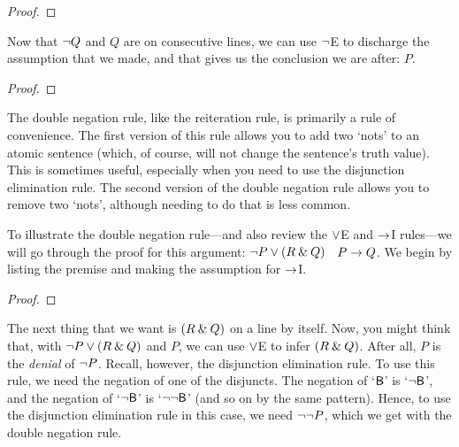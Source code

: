 \begin{proof}
	 	
	 
	\open
\end{proof}
Now that ${\neg} Q$ and $Q$ are on consecutive lines, we can use ${\neg}$E to discharge the assumption that we made, and that gives us the conclusion we are after: $P$.

\begin{proof}
	 	
	 
	\open
	\close
\end{proof}

The double negation rule, like the reiteration rule, is primarily a rule of convenience. The first version of this rule allows you to add two `nots' to an atomic sentence (which, of course, will not change the sentence's truth value). This is sometimes useful, especially when you need to use the disjunction elimination rule. The second version of the double negation rule allows you to remove two `nots', although needing to do that is less common.


To illustrate the double negation rule---and also review the $\vee$E and $\rightarrow$I rules---we will go through the proof for this argument: ${\neg} P \vee (R \mathbin{\&} Q)$ \therefore\ $P \rightarrow Q$. We begin by listing the premise and making the assumption for $\rightarrow$I.

\begin{proof}
	 	
	\open
\end{proof}
The next thing that we want is $(R \mathbin{\&} Q)$ on a line by itself. Now, you might think that, with ${\neg} P \vee (R \mathbin{\&} Q)$ and $P$, we can use $\vee$E to infer $(R \mathbin{\&} Q)$. After all, $P$ is the \textit{denial} of ${\neg} P$. Recall, however, the disjunction elimination rule.
\noindent To use this rule, we need the negation of one of the disjuncts. The negation of `$\mathsf{B}$' is `${\neg}\mathsf{B}$', and the negation of 
`${\neg}\mathsf{B}$' is `${\neg}{\neg}\mathsf{B}$' (and so on by the same pattern). Hence, to use the disjunction elimination rule in this case, we need ${\neg}{\neg} P$, which we get with the double negation rule.

